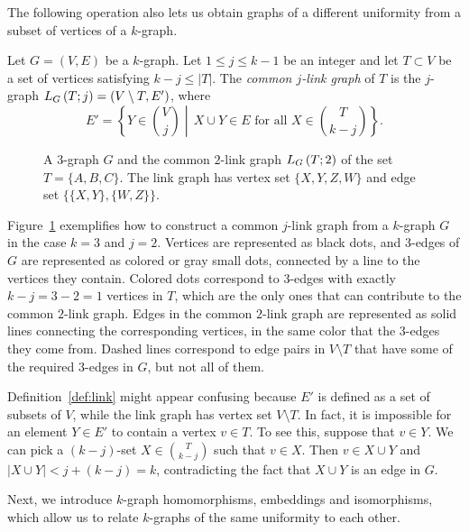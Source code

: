 The following operation also lets us obtain graphs of a
different uniformity from a subset of vertices of a $k$-graph.

\begin{definition} \label{def:link}
    Let $G = (V, E)$ be a $k$-graph.
    Let $1 \leq j \leq k - 1$ be an integer and let
    $T \subset V$ be a set of vertices satisfying $k - j \leq |T|$.
    The \emph{common $j$-link graph} of $T$ is the $j$-graph $L_{G}\left(T; j\right) = (V \setminus T, E')$, where
    \[
        E' = \left\{Y \in \binom{V}{j}\middle\vert \, X \cup Y \in E \text{ for all } X \in \binom{T}{k-j}\right\}.
    \]
\end{definition}

\begin{figure}[htbp]
    \centering
    
    \caption{A $3$-graph $G$ and the common $2$-link graph $L_{G}\left(T; 2\right)$ of the set $T = \{A, B, C\}$.
        The link graph has vertex set $\{X, Y, Z, W\}$ and edge set
        $\{\{X, Y\}, \{W, Z\}\}$.
    }
    \label{fig:link}
\end{figure}

Figure~\ref{fig:link} exemplifies how to construct
a common $j$-link graph from a $k$-graph $G$ in the case $k=3$ and $j=2$.
Vertices are represented as black dots, and $3$-edges of $G$ are represented as colored or gray small dots,
connected by a line to the vertices they contain.
Colored dots correspond to $3$-edges with exactly
$k - j = 3 - 2 = 1$ vertices in $T$, which are the only ones that can contribute to the common $2$-link graph.
Edges in the common $2$-link graph are represented as solid lines connecting the corresponding vertices,
in the same color that the $3$-edges they come from.
Dashed lines correspond to edge pairs
in $V \setminus T$ that have some of the required $3$-edges in $G$, but not all of them.

\begin{remark}
    Definition~\ref{def:link} might appear confusing because $E'$ is defined
    as a set of subsets of $V$, while the link graph has vertex set $V \setminus T$.
    In fact, it is impossible for an element $Y \in E'$ to contain a vertex $v \in T$.
    To see this, suppose that $v \in Y$.
    We can pick a $(k-j)$-set $X \in \binom{T}{k-j}$ such that $v \in X$.
    Then $v \in X \cup Y$ and
    $| X \cup Y | < j + (k-j) = k$, contradicting the fact that $X \cup Y$ is an edge in $G$.
\end{remark}

Next, we introduce $k$-graph homomorphisms, embeddings and isomorphisms, which allow us
to relate $k$-graphs of the same uniformity to each other.

